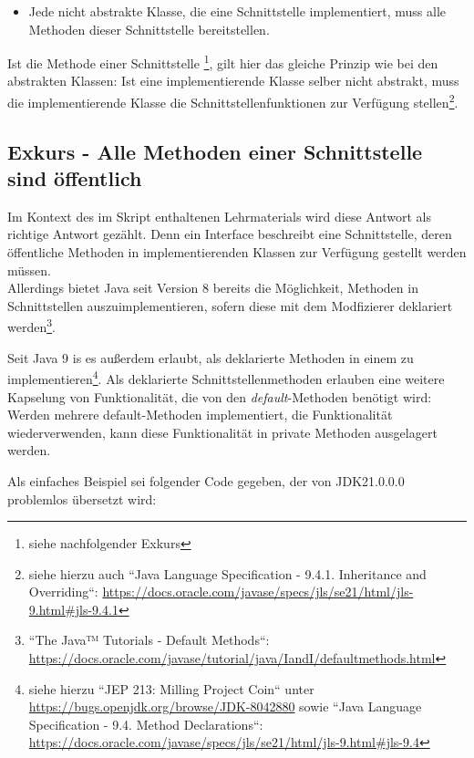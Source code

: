 \begin{itemize}
    \item Jede nicht abstrakte Klasse, die eine Schnittstelle implementiert, muss alle Methoden dieser Schnittstelle bereitstellen.
\end{itemize}

Ist die Methode einer Schnittstelle \footnote{siehe nachfolgender Exkurs}, gilt hier das gleiche Prinzip wie bei den abstrakten Klassen:
Ist eine implementierende Klasse selber nicht abstrakt, muss die implementierende Klasse die Schnittstellenfunktionen zur Verfügung stellen\footnote{
siehe hierzu auch ``Java Language Specification - 9.4.1. Inheritance and Overriding``: \url{https://docs.oracle.com/javase/specs/jls/se21/html/jls-9.html#jls-9.4.1}
}.

\subsection*{Exkurs - Alle Methoden einer Schnittstelle sind öffentlich}

Im Kontext des im Skript enthaltenen Lehrmaterials wird diese Antwort als richtige Antwort gezählt.
Denn ein Interface beschreibt eine Schnittstelle, deren öffentliche Methoden in implementierenden Klassen zur Verfügung gestellt werden müssen.
\\

Allerdings bietet Java seit Version 8 bereits die Möglichkeit, Methoden in Schnittstellen auszuimplementieren, sofern diese mit dem Modfizierer  deklariert werden\footnote{
    ``The Java™ Tutorials - Default Methods``: \url{https://docs.oracle.com/javase/tutorial/java/IandI/defaultmethods.html}
}.

Seit Java 9 is es außerdem erlaubt, als  deklarierte Methoden in einem  zu implementieren\footnote{
siehe hierzu ``JEP 213: Milling Project Coin`` unter \url{https://bugs.openjdk.org/browse/JDK-8042880} sowie ``Java Language Specification - 9.4. Method Declarations``: \url{https://docs.oracle.com/javase/specs/jls/se21/html/jls-9.html#jls-9.4}
}.
Als  deklarierte Schnittstellenmethoden erlauben eine weitere Kapselung von Funktionalität, die von den \textit{default}-Methoden
benötigt wird: Werden mehrere default-Methoden implementiert, die Funktionalität wiederverwenden, kann diese Funktionalität in private Methoden ausgelagert werden.

Als einfaches Beispiel sei folgender Code gegeben, der von JDK21.0.0.0 problemlos übersetzt wird:

